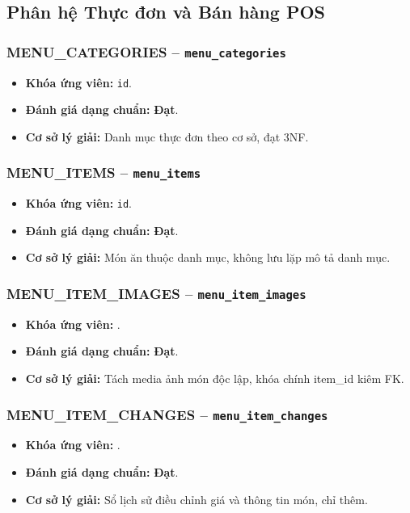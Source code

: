 \subsection{Phân hệ Thực đơn và Bán hàng POS}
\subsubsection{MENU_CATEGORIES -- \texttt{menu\_categories}}
\begin{itemize}
  \item \textbf{Khóa ứng viên:} \texttt{id}.
  \item \textbf{Đánh giá dạng chuẩn:} \textbf{Đạt}.
  \item \textbf{Cơ sở lý giải:} Danh mục thực đơn theo cơ sở, đạt 3NF.
\end{itemize}

\subsubsection{MENU_ITEMS -- \texttt{menu\_items}}
\begin{itemize}
  \item \textbf{Khóa ứng viên:} \texttt{id}.
  \item \textbf{Đánh giá dạng chuẩn:} \textbf{Đạt}.
  \item \textbf{Cơ sở lý giải:} Món ăn thuộc danh mục, không lưu lặp mô tả danh mục.
\end{itemize}

\subsubsection{MENU_ITEM_IMAGES -- \texttt{menu\_item\_images}}
\begin{itemize}
  \item \textbf{Khóa ứng viên:} \texttt{}.
  \item \textbf{Đánh giá dạng chuẩn:} \textbf{Đạt}.
  \item \textbf{Cơ sở lý giải:} Tách media ảnh món độc lập, khóa chính item_id kiêm FK.
\end{itemize}

\subsubsection{MENU_ITEM_CHANGES -- \texttt{menu\_item\_changes}}
\begin{itemize}
  \item \textbf{Khóa ứng viên:} \texttt{}.
  \item \textbf{Đánh giá dạng chuẩn:} \textbf{Đạt}.
  \item \textbf{Cơ sở lý giải:} Sổ lịch sử điều chỉnh giá và thông tin món, chỉ thêm.
\end{itemize}

